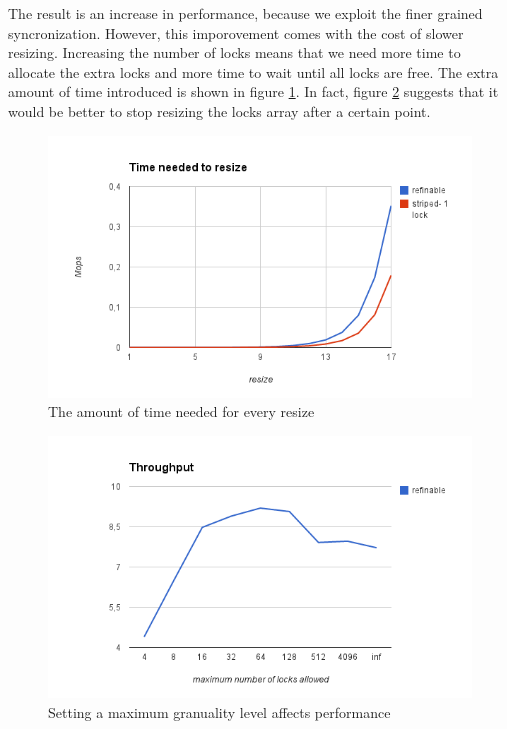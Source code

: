 The result is an increase in performance, because we exploit the finer grained syncronization. However, this imporovement comes with the cost of slower resizing. Increasing the number of locks means that we need more time to allocate the extra locks and more time to wait until all locks are free. The extra amount of time introduced is shown in figure \ref{hashes_refinable_resize}. In fact, figure \ref{hashes_refinable_stop_resizing} suggests that it would be better to stop resizing the locks array after a certain point.
 
\begin{figure}
 \centering
  \includegraphics[scale=0.7]{hashes_refinable_resize.png}
\caption{The amount of time needed for every resize}
\label{hashes_refinable_resize}
\end{figure}

\begin{figure}
 \centering
  \includegraphics[scale=0.7]{hashes_refinable_stop_resizing.png}
\caption{Setting a maximum granuality level affects performance }
\label{hashes_refinable_stop_resizing}
\end{figure}

